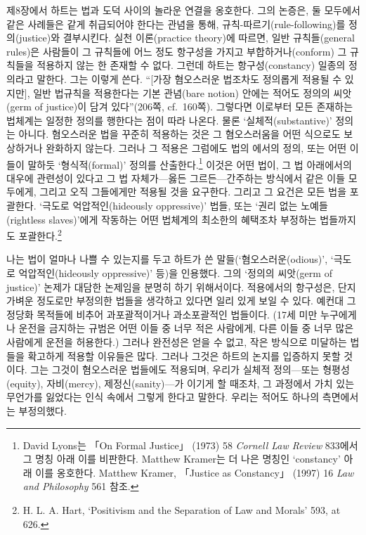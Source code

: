 제8장에서 하트는 법과 도덕 사이의 놀라운 연결을 옹호한다. 그의 논증은,
둘 모두에서 같은 사례들은 같게 취급되어야 한다는 관념을 통해,
규칙-따르기(rule-following)를 정의(justice)와 결부시킨다. 실천
이론(practice theory)에 따르면, 일반 규칙들(general rules)은 사람들이 그
규칙들에 어느 정도 항구성을 가지고 부합하거나(conform) 그 규칙들을
적용하지 않는 한 존재할 수 없다. 그런데 하트는 항구성(constancy)
 일종의 정의라고 말한다. 그는 이렇게 쓴다.
“{[}가장 혐오스러운 법조차도 정의롭게 적용될 수 있지만{]}, 일반
법규칙을 적용한다는 기본 관념(bare notion) 안에는 적어도 정의의
씨앗(germ of justice)이 담겨 있다”(206쪽, cf.~160쪽). 그렇다면 이로부터
모든 존재하는 법체계는 일정한 정의를 행한다는 점이 따라 나온다. 물론
‘실체적(substantive)’ 정의는 아니다. 혐오스러운 법을 꾸준히 적용하는
것은 그 혐오스러움을 어떤 식으로도 보상하거나 완화하지 않는다. 그러나 그
적용은 그럼에도 법의 에서의 정의, 또는 어떤
이들이 말하듯 ‘형식적(formal)’ 정의를 산출한다.\footnote{David Lyons는
  「On Formal Justice」 (1973) 58 \emph{Cornell Law Review} 833에서 그
  명칭 아래 이를 비판한다. Matthew Kramer는 더 나은 명칭인 `constancy'
  아래 이를 옹호한다. Matthew Kramer, 「Justice as Constancy」 (1997) 16
  \emph{Law and Philosophy} 561 참조.} 이것은 어떤 법이, 그 법
아래에서의 대우에 관련성이 있다고 그 법 자체가---옳든 그르든---간주하는
방식에서 같은 이들 모두에게, 그리고 오직 그들에게만 적용될 것을
요구한다. 그리고 그 요건은 모든 법을 포괄한다. ‘극도로
억압적인(hideously oppressive)’ 법들, 또는 ‘권리 없는 노예들(rightless
slaves)’에게 작동하는 어떤 법체계의 최소한의 혜택조차 부정하는
법들까지도 포괄한다.\footnote{H. L. A. Hart, `Positivism and the
  Separation of Law and Morals' 593, at 626.}

나는 법이 얼마나 나쁠 수 있는지를 두고 하트가 쓴
말들(‘혐오스러운(odious)’, ‘극도로 억압적인(hideously oppressive)’ 등)을
인용했다. 그의 ‘정의의 씨앗(germ of justice)’ 논제가 대담한 논제임을
분명히 하기 위해서이다. 적용에서의 항구성은, 단지 가벼운 정도로만
부정의한 법들을 생각하고 있다면 일리 있게 보일 수 있다. 예컨대 그 정당화
목적들에 비추어 과포괄적이거나 과소포괄적인 법들이다. (17세 미만
누구에게나 운전을 금지하는 규범은 어떤 이들 중 너무 적은 사람에게, 다른
이들 중 너무 많은 사람에게 운전을 허용한다.) 그러나 완전성은 얻을 수
없고, 작은 방식으로 미달하는 법들을 확고하게 적용할 이유들은 많다.
그러나 그것은 하트의 논지를 입증하지 못할 것이다. 그는 그것이 혐오스러운
법들에도 적용되며, 우리가 실체적 정의---또는 형평성(equity),
자비(mercy), 제정신(sanity)---가 이기게 할 때조차, 그 과정에서 가치 있는
무언가를 잃었다는 인식 속에서 그렇게 한다고 말한다. 우리는 적어도 하나의
측면에서는 부정의했다.

